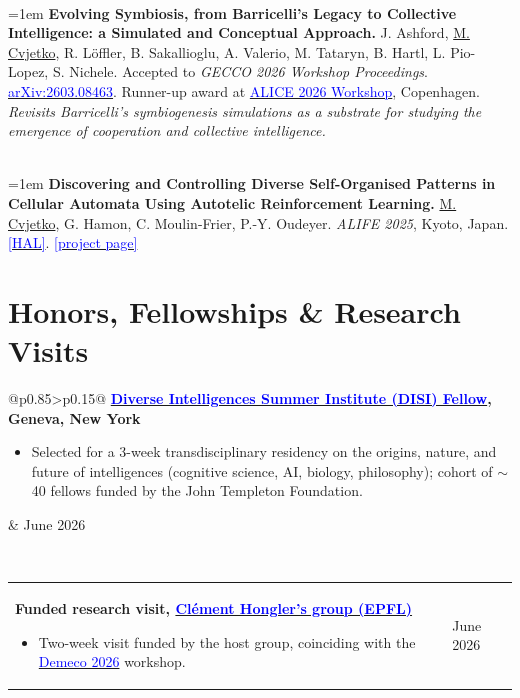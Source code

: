 \documentclass[a4paper]{article}
\makeatletter
\newlength{\tablewidth}
\newenvironment{period}[2]{%
\newcommand{\sarma}{#2}%
\setlength{\tablewidth}{\linewidth}
\addtolength{\tablewidth}{-2\tabcolsep}
\begin{tabular}{@{}p{0.85\tablewidth}>{\raggedleft\arraybackslash}p{0.15\tablewidth}@{}}%
#1 \newline
\begin{itemize}
}{%
\end{itemize} & \sarma \\%
\end{tabular}\\
}
\makeatother
\begin{document}
\begin{description}[leftmargin=1.5em, style=unboxed, font=\normalfont\bfseries, itemsep=0.4em, parsep=0em, topsep=0.2em]
    \item[Workshop paper] ~\\[0.2em]
    \hangindent=1em \textbf{Evolving Symbiosis, from Barricelli's Legacy to Collective Intelligence: a Simulated and Conceptual Approach.} J. Ashford, \underline{M. Cvjetko}, R. L\"{o}ffler, B. Sakallioglu, A. Valerio, M. Tataryn, B. Hartl, L. Pio-Lopez, S. Nichele. Accepted to \textit{GECCO 2026 Workshop Proceedings}. \href{https://arxiv.org/abs/2603.08463}{\textcolor{blue}{arXiv:2603.08463}}. Runner-up award at \href{https://aliceworkshop.org/}{\textcolor{blue}{ALICE 2026 Workshop}}, Copenhagen. \textit{Revisits Barricelli's symbiogenesis simulations as a substrate for studying the emergence of cooperation and collective intelligence.}
    \item[Late-breaking abstract] ~\\[0.2em]
    \hangindent=1em \textbf{Discovering and Controlling Diverse Self-Organised Patterns in Cellular Automata Using Autotelic Reinforcement Learning.} \underline{M. Cvjetko}, G. Hamon, C. Moulin-Frier, P.-Y. Oudeyer. \textit{ALIFE 2025}, Kyoto, Japan. \href{https://hal.science/hal-05399881v1/document}{\textcolor{blue}{[HAL]}}. \href{https://developmentalsystems.org/rl-for-ca/}{\textcolor{blue}{[project page]}}
\end{description}


\section{Honors, Fellowships \& Research Visits}

\begin{period}{\textbf{\href{https://disi.org/}{\textcolor{blue}{Diverse Intelligences Summer Institute (DISI) Fellow}}, Geneva, New York}}{June 2026}
    \item Selected for a 3-week transdisciplinary residency on the origins, nature, and future of intelligences (cognitive science, AI, biology, philosophy); cohort of $\sim$40 fellows funded by the John Templeton Foundation.
\end{period}

\begin{period}{\textbf{Funded research visit, \href{https://www.epfl.ch/labs/csft/}{\textcolor{blue}{Cl\'{e}ment Hongler's group (EPFL)}}}}{May 2026}
    \item Two-week visit funded by the host group, coinciding with the \href{https://www.dem.eco/}{\textcolor{blue}{Demeco 2026}} workshop.
\end{period}
\end{document}
